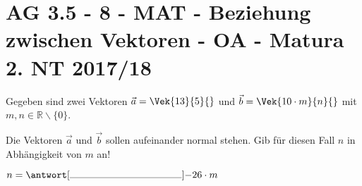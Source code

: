 \section{AG 3.5 - 8 - MAT - Beziehung zwischen Vektoren - OA - Matura 2. NT 2017/18}

\begin{beispiel}[AG 3.5]{1}
Gegeben sind zwei Vektoren $\vec{a}=\Vek{13}{5}{}$ und $\vec{b}=\Vek{10\cdot m}{n}{}$ mit $m, n \in \mathbb{R}\backslash\{0\}$.

Die Vektoren $\vec{a}$ und $\vec{b}$ sollen aufeinander normal stehen. Gib für diesen Fall $n$ in Abhängigkeit von $m$ an!

$n=\antwort[\rule{4cm}{0.3pt}]{-26\cdot m}$
\end{beispiel}